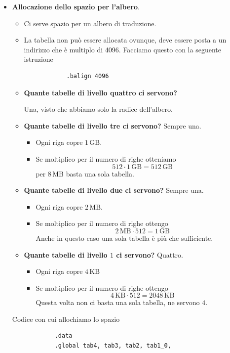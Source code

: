 \begin{itemize}
	\item \textbf{Allocazione dello spazio per l'albero}.
	\begin{itemize}
		\item Ci serve spazio per un albero di traduzione.
		\item La tabella non può essere allocata ovunque, deve essere posta a un indirizzo che è multiplo di 4096. Facciamo questo con la seguente istruzione
		\begin{verbatim}
			.balign 4096
		\end{verbatim}
		\item \textbf{Quante tabelle di livello quattro ci servono?} 
		
		Una, visto che abbiamo solo la radice dell'albero.
		\item \textbf{Quante tabelle di livello tre ci servono?} Sempre una. 
		\begin{itemize}
			\item Ogni riga copre $1\,\text{GB}$.
			\item Se moltiplico per il numero di righe otteniamo
			\[512 \cdot 1\,\text{GB} = 512\,\text{GB}\]
			per $8\,\text{MB}$ basta una sola tabella.
		\end{itemize}
		\item \textbf{Quante tabelle di livello due ci servono?} Sempre una. 
		\begin{itemize}
			\item Ogni riga copre $2\,\text{MB}$.
			\item Se moltiplico per il numero di righe ottengo
			\[2\,\text{MB} \cdot 512 = 1\,\text{GB}\]
			Anche in questo caso una sola tabella è più che sufficiente.
		\end{itemize}
		\item \textbf{Quante tabelle di livello $1$ ci servono?} Quattro.
		\begin{itemize}
			\item Ogni riga copre $4\,\text{KB}$
			\item Se moltiplico per il numero di righe ottengo
			\[4\,\text{KB} \cdot 512 = 2048\,\text{KB} \]
			Questa volta non ci basta una sola tabella, ne servono $4$.
		\end{itemize}
	\end{itemize}
	Codice con cui allochiamo lo spazio 
	\begin{multicols}{2}
		\begin{verbatim}
			.data
			.global tab4, tab3, tab2, tab1_0, 

\end{verbatim}
\end{multicols}
\end{itemize}
